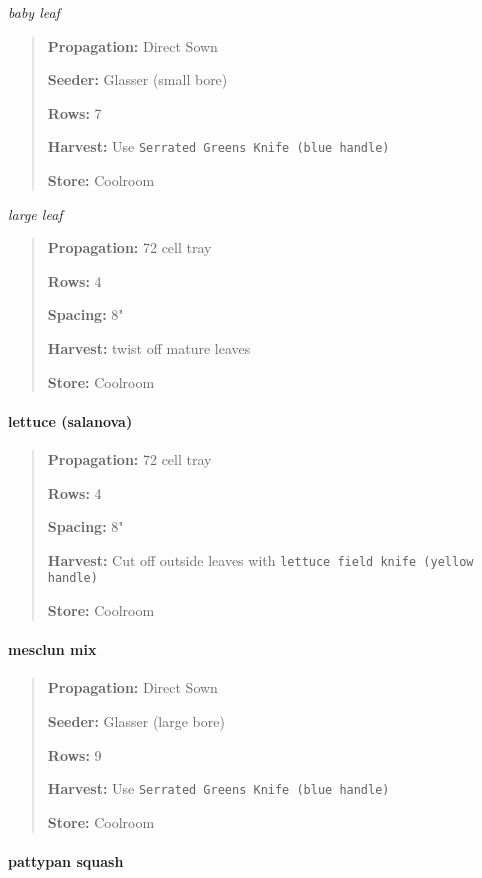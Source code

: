 \emph{baby leaf}

\begin{quote}
\textbf{Propagation:} Direct Sown

\textbf{Seeder:} Glasser (small bore)

\textbf{Rows:} 7

\textbf{Harvest:} Use \texttt{Serrated Greens Knife (blue handle)}

\textbf{Store:} Coolroom
\end{quote}

\emph{large leaf}

\begin{quote}
\textbf{Propagation:} 72 cell tray

\textbf{Rows:} 4

\textbf{Spacing:} 8"

\textbf{Harvest:} twist off mature leaves

\textbf{Store:} Coolroom
\end{quote}

\paragraph{lettuce (salanova)}\label{lettuce-salanova}

\begin{quote}
\textbf{Propagation:} 72 cell tray

\textbf{Rows:} 4

\textbf{Spacing:} 8"

\textbf{Harvest:} Cut off outside leaves with
\texttt{lettuce field knife (yellow handle)}

\textbf{Store:} Coolroom
\end{quote}

\paragraph{mesclun mix}\label{mesclun-mix}

\begin{quote}
\textbf{Propagation:} Direct Sown

\textbf{Seeder:} Glasser (large bore)

\textbf{Rows:} 9

\textbf{Harvest:} Use \texttt{Serrated Greens Knife (blue handle)}

\textbf{Store:} Coolroom
\end{quote}

\paragraph{pattypan squash}\label{pattypan-squash}

